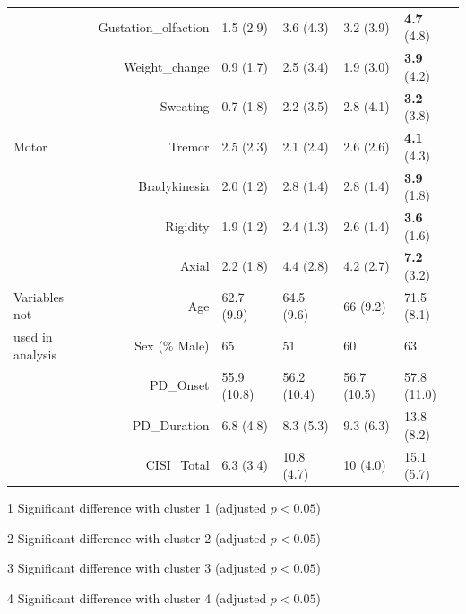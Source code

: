 \documentclass[preprint,3p,twocolumn]{elsarticle} %
\begin{document}
\begin{table}[t]
\begin{threeparttable}
\begin{tabular}{lrllll}
  &Gustation\_olfaction & 1.5 (2.9)\tnote{234} & 3.6 (4.3)\tnote{1} & 3.2 (3.9)\tnote{14} &
  \textbf{4.7} (4.8)\tnote{13} \\
  &Weight\_change & 0.9 (1.7)\tnote{234} & 2.5 (3.4)\tnote{14} & 1.9 (3.0)\tnote{14} & \textbf{3.9} (4.2)\tnote{123} \\
  &Sweating & 0.7 (1.8)\tnote{234} & 2.2 (3.5)\tnote{1} & 2.8 (4.1)\tnote{1} & \textbf{3.2}
  (3.8)\tnote{1} \\
  \midrule
  Motor &
  Tremor & 2.5 (2.3) & 2.1 (2.4) & 2.6 (2.6) & \textbf{4.1} (4.3) \\
  &Bradykinesia & 2.0 (1.2)\tnote{234} & 2.8 (1.4)\tnote{14} & 2.8 (1.4)\tnote{14} & \textbf{3.9} (1.8)\tnote{123} \\
  &Rigidity & 1.9 (1.2)\tnote{234} & 2.4 (1.3)\tnote{14} & 2.6 (1.4)\tnote{14} & \textbf{3.6} (1.6)\tnote{123} \\
  &Axial & 2.2 (1.8)\tnote{234} & 4.4 (2.8)\tnote{14} & 4.2 (2.7)\tnote{14} & \textbf{7.2} (3.2)\tnote{123} \\
  \midrule
  Variables not & Age & 62.7 (9.9)\tnote{34} & 64.5 (9.6)\tnote{4} & 66 (9.2)\tnote{14} & 71.5
  (8.1)\tnote{123} \\
  used in analysis & Sex (\% Male) & 65\tnote{2} & 51\tnote{1} & 60 & 63 \\
  & PD\_Onset & 55.9 (10.8) & 56.2 (10.4) & 56.7 (10.5) & 57.8 (11.0) \\
  & PD\_Duration & 6.8 (4.8)\tnote{34} & 8.3 (5.3)\tnote{4} & 9.3 (6.3)\tnote{14} & 13.8
  (8.2)\tnote{123} \\
  & CISI\_Total & 6.3 (3.4)\tnote{234} & 10.8 (4.7)\tnote{14} & 10 (4.0)\tnote{14} & 15.1 (5.7)\tnote{123} \\
   \bottomrule
\end{tabular}
  \begin{tablenotes}
    \small
    \item[1] Significant difference with cluster 1 (adjusted $p < 0.05$)
    \item[2] Significant difference with cluster 2 (adjusted $p < 0.05$)
    \item[3] Significant difference with cluster 3 (adjusted $p < 0.05$)
    \item[4] Significant difference with cluster 4 (adjusted $p < 0.05$)
  \end{tablenotes}
  \end{threeparttable}
\end{table}
\end{document}

